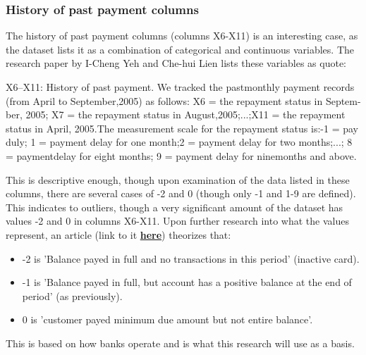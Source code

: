         \subsubsection{History of past payment columns}
            The history of past payment columns (columns X6-X11) is an interesting case, as the dataset lists it as a combination of categorical and continuous variables. The research paper by I-Cheng Yeh and Che-hui Lien \cite{CCdata} lists these variables as quote:
            \begin{displayquote}
                X6–X11: History of past payment. We tracked the pastmonthly payment records (from April to September,2005) as follows: X6 = the repayment status in Septem-ber,  2005;  X7 = the  repayment  status  in  August,2005;...;X11 = the repayment status in April, 2005.The measurement scale for the repayment status is:-1 = pay duly; 1 = payment delay for one month;2 = payment delay for two months;...; 8 = paymentdelay for eight months; 9 = payment delay for ninemonths and above.
            \end{displayquote}
            This is descriptive enough, though upon examination of the data listed in these columns, there are several cases of -2 and 0 (though only -1 and 1-9 are defined). This indicates to outliers, though a very significant amount of the dataset has values -2 and 0 in columns X6-X11. Upon further research into what the values represent, an article (link to it \href{http://inseaddataanalytics.github.io/INSEADAnalytics/CourseSessions/ClassificationProcessCreditCardDefault.html}{\textbf{here}}) theorizes that\cite{1}:
            \begin{itemize}
                \item -2 is 'Balance payed in full and no transactions in this period' (inactive card).
                \item -1 is 'Balance payed in full, but account has a positive balance at the end of period' (as previously).
                \item 0 is 'customer payed minimum due amount but not entire balance'.
            \end{itemize}
            This is based on how banks operate and is what this research will use as a basis.\\\\
    
